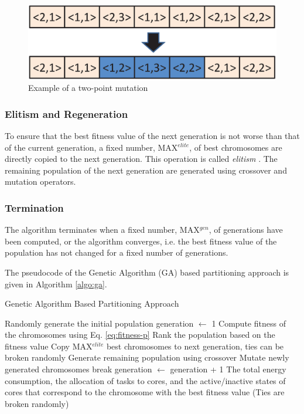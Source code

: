 \documentclass[conference]{IEEEtran}
\begin{document}
\begin{figure}[h]
	\begin{center}
		\includegraphics[scale=0.35]{mutation.eps}
	\end{center}
		\caption{Example of a two-point mutation}
	\label{fig:mutation}
\end{figure}


\subsubsection{Elitism and Regeneration} To ensure that the best fitness value of the next generation is not worse than that of the current generation, 
a fixed number, MAX$^{elite}$, of best chromosomes are directly copied to the next generation. This operation is called \emph{elitism} \cite{Goldberg}.
The remaining population of the next generation are generated using crossover and mutation operators.


\subsubsection{Termination} The algorithm terminates when a fixed number, MAX$^{gen}$, of generations 
have been computed, or the algorithm converges, i.e. the best fitness value of the population has not changed for a fixed number
of generations.  

The pseudocode of the Genetic Algorithm (GA) based partitioning approach is given in Algorithm \ref{algo:ga}.

\begin{algorithm} 
\caption{Genetic Algorithm Based Partitioning Approach} \label{algo:ga}
\footnotesize
\begin{algorithmic}[1] 
\STATE Randomly generate the initial population 
\STATE generation $\leftarrow$ 1
\STATE Compute fitness of the chromosomes using Eq. \ref{eq:fitness-p}
\STATE Rank the population based on the fitness value
\STATE Copy MAX$^{elite}$ best chromosomes to next generation, ties can be broken randomly
\STATE Generate remaining population using crossover
\STATE Mutate newly generated chromosomes 
\STATE break
\ENDIF
\STATE generation  $\leftarrow$ generation  + 1
\ENDWHILE
\PRINT The total energy consumption, the allocation of tasks to cores, and the active/inactive states of cores that
correspond to the chromosome with the best fitness value (Ties are broken randomly)
\end{algorithmic}
\end{algorithm}
\end{document}
